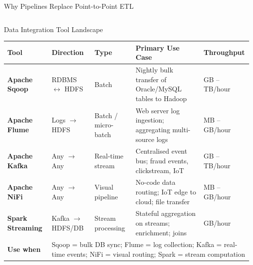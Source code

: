 \documentclass[aspectratio=169,10pt]{beamer}
\begin{document}
\begin{frame}{Why Pipelines Replace Point-to-Point ETL}
\begin{columns}[T]
\begin{center}
      \end{center}
  \end{columns}
\end{frame}

\begin{frame}{Data Integration Tool Landscape}
  \centering
  \renewcommand{\arraystretch}{1.5}
  \begin{tabular}{p{2.6cm}p{2.0cm}p{2.2cm}p{3.5cm}p{2.2cm}}
    \toprule
    \textbf{Tool} & \textbf{Direction} & \textbf{Type} & \textbf{Primary Use Case} & \textbf{Throughput} \\
    \midrule
    \textbf{Apache Sqoop} &
      RDBMS $\leftrightarrow$ HDFS &
      Batch &
      Nightly bulk transfer of Oracle/MySQL tables to Hadoop &
      GB -- TB/hour \\
    \textbf{Apache Flume} &
      Logs $\to$ HDFS &
      Batch / micro-batch &
      Web server log ingestion; aggregating multi-source logs &
      MB -- GB/hour \\
    \textbf{Apache Kafka} &
      Any $\to$ Any &
      Real-time stream &
      Centralised event bus; fraud events, clickstream, IoT &
      GB -- TB/hour \\
    \textbf{Apache NiFi} &
      Any $\to$ Any &
      Visual pipeline &
      No-code data routing; IoT edge to cloud; file transfer &
      MB -- GB/hour \\
    \textbf{Spark Streaming} &
      Kafka $\to$ HDFS/DB &
      Stream processing &
      Stateful aggregation on streams; enrichment; joins &
      GB/hour \\
    \midrule
    \textbf{Use when} &
      \multicolumn{4}{l}{\small Sqoop = bulk DB sync;\;
        Flume = log collection;\;
        Kafka = real-time events;\;
        NiFi = visual routing;\;
        Spark = stream computation} \\
    \bottomrule
  \end{tabular}
\end{frame}
\end{document}
